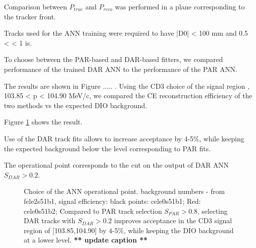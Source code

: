 Comparison between $P_{true}$ and $P_{reco}$ was performed in a  plane corresponding to the tracker front.

Tracks used for the ANN training were required to have |D0| < 100 mm and 0.5 < \tandip < 1 is. 

To choose between the PAR-based and DAR-based fitters, we compared performance of the
trained DAR ANN to the performance of the PAR ANN.

The results are shown in Figure ..... .
Using the CD3 choice of the signal region , 103.85 < p < 104.90 MeV/c, we compared the
CE reconstruction efficiency of the two methods vs the expected DIO background.

Figure \ref{fig:ann_operational_point_choice} shows the result.

Use of the DAR track fits allows to increase acceptance by 4-5\%, while keeping the expected
background below the level corresponding to PAR fits.

The operational point corresponds to the cut on the output of DAR ANN $S_{DAR} > 0.2$.

\begin{figure}
\caption{
  \label{fig:ann_operational_point_choice}
  Choice of the ANN operational point. background numbers - from fele2s51b1,
  signal efficiency: black points: cele0s51b1; Red: cele0s51b2;
  Compared to PAR track selection $S_{PAR} > 0.8$, selecting DAR tracks with $S_{DAR} > 0.2$ 
  improves acceptance in the CD3 signal region of [103.85,104.90] by 4-5\%, 
  while keeping the DIO background at a lower level.
  {\color{red} {\bf *** update caption **}}
}
\end{figure}

